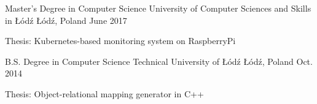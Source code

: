 

\begin{cventries}

  \cventry
    {Master's Degree in Computer Science} %
    {University of Computer Sciences and Skills in Łódź} %
    {Łódź, Poland} %
    {June 2017} %
    {
      \begin{cvitems} %
        \item {Thesis: Kubernetes-based monitoring system on RaspberryPi}
      \end{cvitems}
    }

  \cventry
  {B.S. Degree in Computer Science} %
  {Technical University of Łódź} %
  {Łódź, Poland} %
  {Oct. 2014} %
  {
  \begin{cvitems} %
    \item {Thesis: Object-relational mapping generator in C++}
  \end{cvitems}
  }

\end{cventries}
